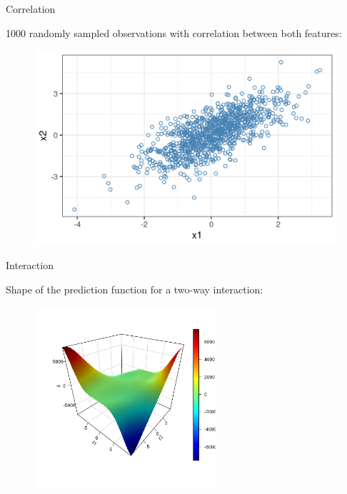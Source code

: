 \documentclass[11pt,compress,t,notes=noshow, xcolor=table]{beamer}
\begin{document}
\begin{vbframe}{Correlation}

1000 randomly sampled observations with correlation between both features:

\begin{figure}
\includegraphics[width = \textwidth]{figure/correlation}
\end{figure}
\end{vbframe}

\begin{vbframe}{Interaction}

Shape of the prediction function for a two-way interaction:

\begin{figure}
\includegraphics[width = 0.6\textwidth]{figure/interaction}
\end{figure}
\end{vbframe}
\end{document}
